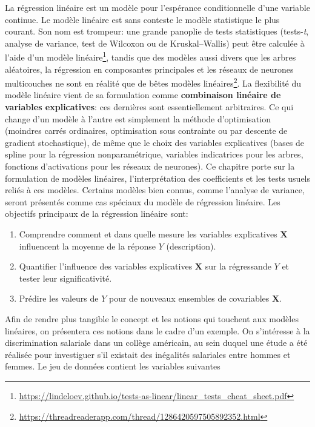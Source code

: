 \documentclass[
  11pt,
  letterpaper,
]{article}
\providecommand{\tightlist}{%
  \setlength{\itemsep}{0pt}\setlength{\parskip}{0pt}}
\renewcommand{\href}[2]{#2\footnote{\url{#1}}}
\theoremstyle{definition}
\theoremstyle{definition}
\theoremstyle{definition}
\theoremstyle{remark}
\begin{document}
La régression linéaire est un modèle pour l'espérance conditionnelle d'une variable continue. Le modèle linéaire est sans conteste le modèle statistique le plus courant. Son nom est trompeur: une grande panoplie de tests statistiques (tests-\emph{t}, analyse de variance, test de Wilcoxon ou de Kruskal--Wallis) \href{https://lindeloev.github.io/tests-as-linear/linear_tests_cheat_sheet.pdf}{peut être calculée à l'aide d'un modèle linéaire}, tandis que \href{https://threadreaderapp.com/thread/1286420597505892352.html}{des modèles aussi divers que les arbres aléatoires, la régression en composantes principales et les réseaux de neurones multicouches ne sont en réalité que de bêtes modèles linéaires}. La flexibilité du modèle linéaire vient de sa formulation comme \textbf{combinaison linéaire de variables explicatives}: ces dernières sont essentiellement arbitraires. Ce qui change d'un modèle à l'autre est simplement la méthode d'optimisation (moindres carrés ordinaires, optimisation sous contrainte ou par descente de gradient stochastique), de même que le choix des variables explicatives (bases de spline pour la régression nonparamétrique, variables indicatrices pour les arbres, fonctions d'activations pour les réseaux de neurones). Ce chapitre porte sur la formulation de modèles linéaires, l'interprétation des coefficients et les tests usuels reliés à ces modèles. Certains modèles bien connus, comme l'analyse de variance, seront présentés comme cas spéciaux du modèle de régression linéaire. Les objectifs principaux de la régression linéaire sont:

\begin{enumerate}
\def\labelenumi{\arabic{enumi}.}
\tightlist
\item
  Comprendre comment et dans quelle mesure les variables explicatives \(\mathbf{X}\) influencent la moyenne de la réponse \(Y\) (description).
\item
  Quantifier l'influence des variables explicatives \(\mathbf{X}\) sur la régressande \(Y\) et tester leur significativité.
\item
  Prédire les valeurs de \(Y\) pour de nouveaux ensembles de covariables \(\mathbf{X}\).
\end{enumerate}

Afin de rendre plus tangible le concept et les notions qui touchent aux modèles linéaires, on présentera ces notions dans le cadre d'un exemple. On s'intéresse à la discrimination salariale dans un collège américain, au sein duquel une étude a été réalisée pour investiguer s'il existait des inégalités salariales entre hommes et femmes. Le jeu de données contient les variables suivantes
\end{document}
